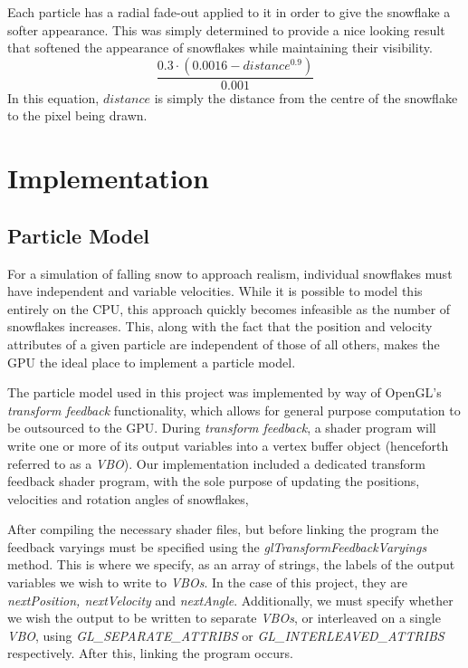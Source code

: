 \documentclass[conference]{acmsiggraph}
\begin{document}
Each particle has a radial fade-out applied to it in order to give the snowflake a softer appearance. This was simply determined to provide a nice looking result that softened the appearance of snowflakes while maintaining their visibility.
\begin{equation} \label{eq:alpha}
\frac{0.3 \cdot (0.0016 - distance^{0.9})} {0.001}
\end{equation}
In this equation, $distance$ is simply the distance from the centre of the snowflake to the pixel being drawn.

\section{Implementation}

\subsection{Particle Model}
For a simulation of falling snow to approach realism, individual snowflakes must have independent and variable velocities. While it is possible to model this entirely on the CPU, this approach quickly becomes infeasible as the number of snowflakes increases. This, along with the fact that the position and velocity attributes of a given particle are independent of those of all others, makes the GPU the ideal place to implement a particle model.

The particle model used in this project was implemented by way of OpenGL's \textit{transform feedback} functionality, which allows for general purpose computation to be outsourced to the GPU. During \textit{transform feedback}, a shader program will write one or more of its output variables into a vertex buffer object (henceforth referred to as a \textit{VBO}). Our implementation included a dedicated transform feedback shader program, with the sole purpose of updating the positions, velocities and rotation angles of snowflakes, 

After compiling the necessary shader files, but before linking the program the feedback varyings must be specified using the \textit{glTransformFeedbackVaryings} method. This is where we specify, as an array of strings, the labels of the output variables we wish to write to \textit{VBOs}. In the case of this project, they are \textit{nextPosition, nextVelocity} and \textit{nextAngle}. Additionally, we must specify whether we wish the output to be written to separate \textit{VBOs}, or interleaved on a single \textit{VBO}, using \textit{GL\_SEPARATE\_ATTRIBS} or \textit{GL\_INTERLEAVED\_ATTRIBS} respectively. After this, linking the program occurs.
\end{document}
